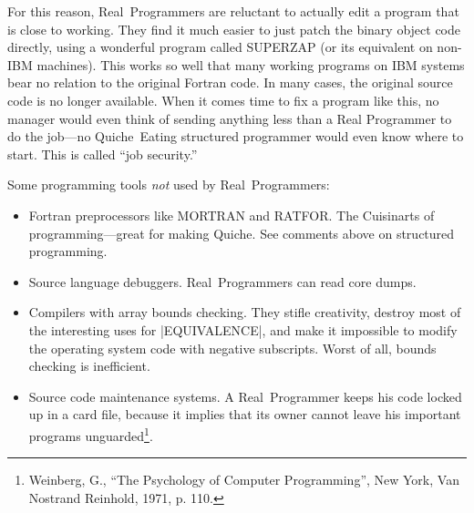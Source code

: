 \documentclass[10pt,letterpaper]{article}
\newcommand{\acro}[1]{{\small #1\spacefactor1000}}
\begin{document}
For this reason, Real~Programmers are reluctant to actually edit a
program that is close to working. They find it much easier to just
patch the binary object code directly, using a wonderful program
called \acro{SUPERZAP} (or its equivalent on non-\acro{IBM} machines). This works so
well that many working programs on \acro{IBM} systems bear no relation to the
original Fortran code. In many cases, the original source code is no
longer available. When it comes time to fix a program like this, no
manager would even think of sending anything less than a Real
Programmer to do the job---no Quiche~Eating structured programmer
would even know where to start. This is called ``job security.''

Some programming tools \emph{not} used by Real~Programmers:
\begin{itemize}
\item Fortran preprocessors like \acro{MORTRAN} and \acro{RATFOR}. The
Cuisinarts of programming---great for making Quiche. See comments
above on structured programming.
\item Source language debuggers. Real~Programmers can read core dumps.
\item Compilers with array bounds checking. They stifle creativity,
destroy most of the interesting uses for |EQUIVALENCE|, and make it impossible
to modify the operating system code with negative subscripts. Worst of
all, bounds checking is inefficient.
\item Source code maintenance
systems. A Real~Programmer keeps his code locked up in a card file,
because it implies that its owner cannot leave his important programs
unguarded\footnote{%
Weinberg, G., ``The Psychology of Computer Programming'', New York, Van Nostrand Reinhold, 1971, p. 110.}.
\end{itemize}
\end{document}
